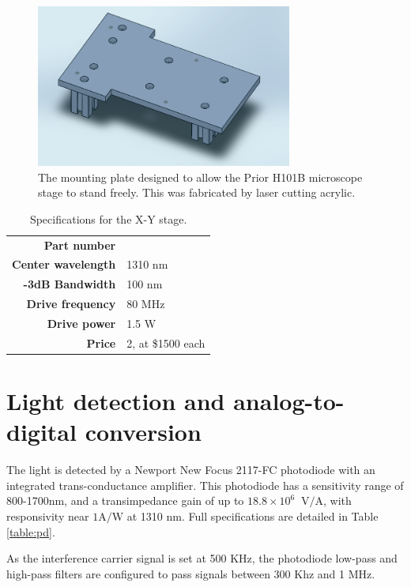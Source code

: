 \begin{figure}[h!]
\centering
\includegraphics[width=0.75\textwidth]{Images/Alignment/x-y-mount.png}
\caption{The mounting plate designed to allow the Prior H101B microscope stage to stand freely. This was fabricated by laser cutting acrylic.}
\end{figure}

\begin{table}[h!]
\centering
\begin{tabular}{ >{\bf}r | l}
Part number & \\
Center wavelength & 1310 nm \\
-3dB Bandwidth & 100 nm \\
Drive frequency & 80 MHz \\
Drive power & 1.5 W \\
Price & 2, at \$1500 each \\
\end{tabular}
\caption{Specifications for the X-Y stage.}
\end{table} 


\section{Light detection and analog-to-digital conversion}

The light is detected by a Newport New Focus 2117-FC photodiode with an integrated trans-conductance amplifier. This photodiode has a sensitivity range of 800-1700nm, and a transimpedance gain of up to $18.8 \times 10^6 \;\; \mathrm{V}/\mathrm{A}$, with responsivity near $1 \mathrm{A}/\mathrm{W}$ at 1310 nm. Full specifications are detailed in Table \ref{table:pd}.

As the interference carrier signal is set at 500 KHz, the photodiode low-pass and high-pass filters are configured to pass signals between 300 Khz and 1 MHz.

